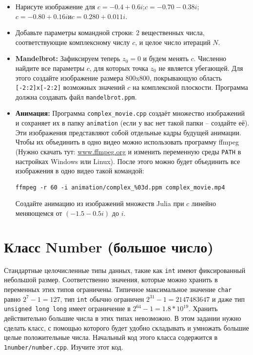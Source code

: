 \documentclass{article}
\begin{document}
\begin{itemize}
\item Нарисуте изображение для $c = -0.4 + 0.6i$;\quad $c = -0.70 - 0.38i$;\quad $c = -0.80 + 0.16i$\quad  и\quad $c = 0.280 + 0.011i$.
\item Добавьте параметры командной строки: 2 вещественных числа, соответствующие комплексному числу $c$, и целое число итераций $N$. 
\item \textbf{Mandelbrot:} Зафиксируем теперь $z_0 = 0$ и будем менять $c$. Численно найдите все параметры $c$, для которых точка $z_0$ не является убегающей. Для этого создайте изображение размера 800x800, покрывающую область \texttt{[-2:2]x[-2:2]} возможных значений $c$ на комплексной плоскости. Программа должна создавать файл \texttt{mandelbrot.ppm}.

\item \textbf{Анимация:} Программа \texttt{complex\_movie.cpp} создаёт множество изображений и сохраняет их в папку \texttt{animation} (если у вас нет такой папки -- создайте её). Эти изображения представляют собой отдельные кадры будущей анимации. Чтобы их объединить в одно видео можно использовать программу ffmpeg (Нужно скачать тут: \href{https://www.ffmpeg.org/}{www.ffmpeg.org} и изменить переменную среды \texttt{PATH} в настройках Windows или Linux). После этого можно будет объединить все изображения в одно видео такой командой:
\begin{verbatim}
ffmpeg -r 60 -i animation/complex_%03d.ppm complex_movie.mp4
\end{verbatim}
Создайте анимацию из изображений множеств Julia при $c$ линейно меняющемся от $(-1.5 - 0.5i)$ до $i$.
\end{itemize}


\newpage
\section*{Класс Number (большое число)}
Стандартные целочисленные  типы данных, такие как \texttt{int} имеют фиксированный небольшой размер. Соответственно значения, которые можно хранить в переменных этих типов ограничены. Типичное максимальное значение \texttt{char} равно $2^7 - 1 = 127$, тип \texttt{int} обычно ограничен $2^{31}-1 = 2147483647$ и даже тип \texttt{unsigned long long} имеет ограничение в $2^{64}-1 = 1.8 * 10^{19}$. Хранить действительно большие числа в этих типах невозможно. В этом задании нужно сделать класс, с помощью которого будет удобно складывать и умножать большие целые положительные числа. Начальный код этого класса содержится в \texttt{1number/number.cpp}. Изучите этот код.
\end{document}
